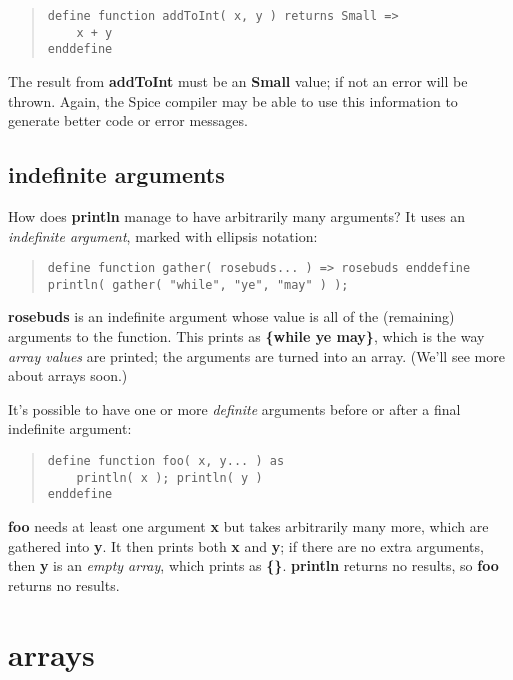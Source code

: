 \documentclass{report}
\begin{document}
\begin{quote}
\begin{verbatim}
define function addToInt( x, y ) returns Small =>
    x + y
enddefine
\end{verbatim}
\end{quote}


The result from {\bf addToInt} must be an {\bf Small} value; if not an error will be
thrown. Again, the Spice compiler may be able to use this information to
generate better code or error messages.

\section{indefinite arguments}


How does {\bf println} manage to have arbitrarily many arguments? It uses an
{\em indefinite argument}, marked with ellipsis notation:

\begin{quote}
\begin{verbatim}
define function gather( rosebuds... ) => rosebuds enddefine
println( gather( "while", "ye", "may" ) );
\end{verbatim}
\end{quote}


{\bf rosebuds} is an indefinite argument whose value is all of the (remaining)
arguments to the function. This prints as {\bf \{while ye may\}}, which
is the way {\em array values} are printed; the arguments are turned into an array.
(We'll see more about arrays soon.)

It's possible to have one or more {\em definite} arguments before or after a final
indefinite argument:

\begin{quote}
\begin{verbatim}
define function foo( x, y... ) as
    println( x ); println( y )
enddefine
\end{verbatim}
\end{quote}


{\bf foo} needs at least one argument {\bf x} but takes arbitrarily many more, which
are gathered into {\bf y}. It then prints both {\bf x} and {\bf y}; if there are no extra
arguments, then {\bf y} is an {\em empty array}, which prints as {\bf \{\}}. {\bf println}
returns no results, so {\bf foo} returns no results.\chapter{arrays}
\end{document}
